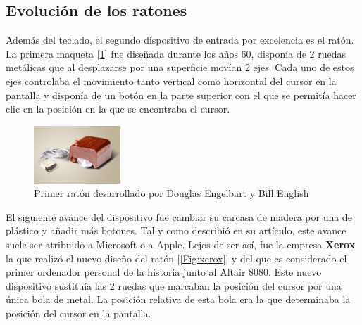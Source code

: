 \subsection{Evoluci\'on de los ratones}

Adem\'as del teclado, el segundo dispositivo de entrada por excelencia es el rat\'on. La primera maqueta [\ref{Fig:primerraton}] fue dise\~nada durante los a\~nos 60, dispon\'ia de 2 ruedas met\'alicas que al desplazarse por una superficie mov\'ian 2 ejes. Cada uno de estos ejes controlaba el movimiento tanto vertical como horizontal del cursor en la pantalla y dispon\'ia de un bot\'on en la parte superior con el que se permit\'ia hacer clic en la posici\'on en la que se encontraba el cursor.\\

\begin{figure}[h]
\centering
\includegraphics[width=0.29\textwidth]{./Imagenes/Bitmap/Primer_raton.jpg}
\caption{Primer rat\'on desarrollado por Douglas Engelbart y Bill English}
\label{Fig:primerraton}
\end{figure}

El siguiente avance del dispositivo fue cambiar su carcasa de madera por una de pl\'astico y a\~nadir m\'as botones. Tal y como describi\'o \cite{xerox} en su art\'iculo, este avance suele ser atribuido a Microsoft o a Apple. Lejos de ser as\'i, fue la empresa \textbf{Xerox} la que realiz\'o el nuevo dise\~no del rat\'on [\ref{Fig:xerox}] y del que es considerado el primer ordenador personal de la historia junto al Altair 8080. Este nuevo dispositivo sustitu\'ia las 2 ruedas que marcaban la posici\'on del cursor por una \'unica bola de metal. La posici\'on relativa de esta bola era la que determinaba la posici\'on del cursor en la pantalla. 

